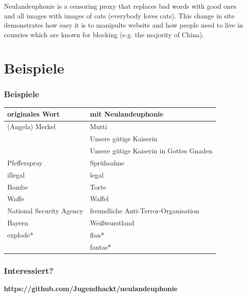 \documentclass [xcolor=dvipsnames] {beamer}
\begin{document}
\begin{frame}
	\begin{center}
		Neulandeuphonie is a censoring proxy that replaces bad words with good ones and all images with images of cats (everybody loves cats). This change in site demonstrates how easy it is to manipulte website and how people need to live in counries which are known for blocking (e.g. the majority of China).
	\end{center}
\end{frame}

\section{Beispiele}
\begin{frame}
	\frametitle{\sc Beispiele}
	\begin{center}
		\begin{tabular}{l|l}
			originales Wort & mit Neulandeuphonie\\
			\hline
			(Angela) Merkel & Mutti\\
			& Unsere gütige Kaiserin\\
			& Unsere gütige Kaiserin in Gottes Gnaden\\
			Pfefferspray & Sprühsahne\\
			illegal & legal\\
			Bombe & Torte\\
			Waffe & Waffel\\
			National Security Agency & freundliche Anti-Terror-Organisation\\
			Bayern & Weißwurstland\\
			explode* & flan*\\
			& fantas*
		\end{tabular}
	\end{center}
\end{frame}

\begin{frame}
	\frametitle{\sc Interessiert?}
	\begin{center}
		{\bf https://github.com/Jugendhackt/neulandeuphonie}
	\end{center}
\end{frame}

\begin{frame}
	\titlepage
\end{frame}
\end{document}
